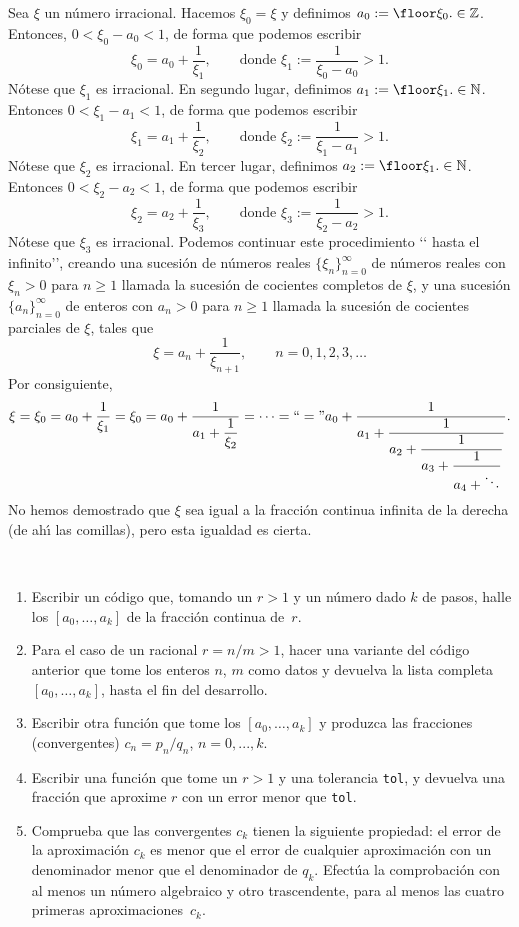 Sea $\xi$ un n\'umero irracional. Hacemos $\xi_0=\xi$ y definimos
$a_0:=\floor\xi_0.\in\mathbb{Z}$. Entonces, $0<\xi_0-a_0<1$, de forma que
podemos escribir
$$
\xi_0=a_0+\frac1{\xi_1}, \qquad \text{donde }\xi_1:=\frac1{\xi_0-a_0}>1.
$$
N\'otese que $\xi_1$ es irracional. En segundo lugar, definimos
$a_1:=\floor\xi_1.\in\mathbb{N}$. Entonces $0<\xi_1-a_1<1$, de forma que podemos
escribir
$$
\xi_1=a_1+\frac1{\xi_2}, \qquad \text{donde }\xi_2:=\frac1{\xi_1-a_1}>1.
$$
N\'otese que $\xi_2$ es irracional. En tercer lugar, definimos
$a_2:=\floor\xi_1.\in\mathbb{N}$. Entonces $0<\xi_2-a_2<1$, de forma que podemos
escribir
$$
\xi_2=a_2+\frac1{\xi_3}, \qquad \text{donde }\xi_3:=\frac1{\xi_2-a_2}>1.
$$
N\'otese que $\xi_3$ es irracional. Podemos continuar este procedimiento \lq\lq
hasta el infinito\rq\rq, creando una sucesi\'on de n\'umeros reales
$\{\xi_n\}_{n=0}^\infty$ de n\'umeros reales con $\xi_n>0$ para $n\ge1$ llamada
la sucesi\'on de cocientes completos de $\xi$, y una sucesi\'on
$\{a_n\}_{n=0}^\infty$ de enteros con $a_n>0$ para $n\ge1$ llamada la sucesi\'on
de cocientes parciales de $\xi$, tales que
$$
\xi=a_n+\frac1{\xi_{n+1}},\qquad n=0,1,2,3,\dots
$$
Por consiguiente, 
$$
\xi=\xi_0=a_0+\frac1{\xi_1}=\xi_0=a_0+\frac1{a_1+\displaystyle\frac1{\xi_2}}
=\cdots=\text{\lq\lq}=\text{\rq\rq}
a_0+\frac1{a_1+\displaystyle\frac1{a_2+\displaystyle\frac1{
a_3+\displaystyle\frac1{a_4+\ddots}}}}.
$$
No hemos demostrado que $\xi$ sea igual a la fracci\'on continua infinita de la
derecha (de ah\'{\i} las comillas), pero esta igualdad es cierta. 

\

\begin{ejer}

\begin{enumerate}
 \item Escribir un c\'odigo  que, tomando un \mbox{$r > 1$} y un n\'umero
 dado $k$ de pasos, halle los
$[a_0, \dots , a_k ]$ de la fracci\'on
 continua de~$r$.
 
\item Para el caso de un racional $r = n/m > 1$, hacer una variante del c\'odigo
anterior
 que tome los enteros $n$, $m$ como datos y devuelva la lista completa
 $[a_0, \dots , a_k ]$, hasta el fin del desarrollo.

 \item Escribir otra funci\'on  que tome los $[a_0, \dots , a_k ]$ y produzca
las fracciones (convergentes) $c_n=p_n/q_n$, $n=0,...,k$.

\item Escribir una funci\'on  que tome un \mbox{$r > 1$} y una tolerancia
\texttt{tol}, y devuelva una fracci\'on que aproxime $r$ con un error menor  que
\texttt{tol}.

\item Comprueba que las convergentes $c_k$ tienen la siguiente propiedad: el
error de la aproximaci\'on  $c_k$ es menor que el error de cualquier
aproximaci\'on
 con un denominador menor que el denominador de $q_k$. Efect\'ua
 la comprobaci\'on con al menos un n\'umero algebraico
y otro trascendente, para al menos las cuatro primeras aproximaciones~$c_k$.

\end{enumerate}
\end{ejer}


